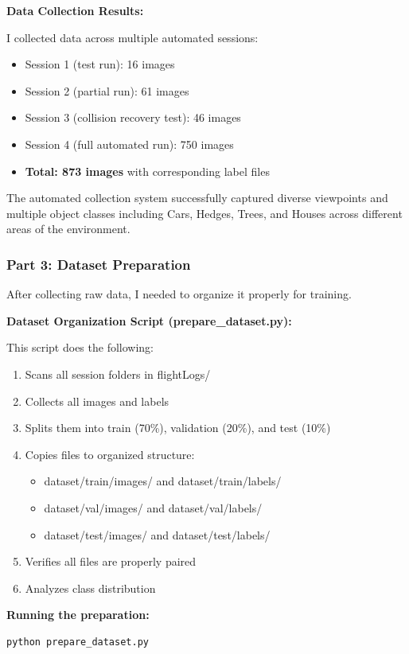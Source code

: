 \textbf{Data Collection Results:}

I collected data across multiple automated sessions:
\begin{itemize}
	\item Session 1 (test run): 16 images
	\item Session 2 (partial run): 61 images
	\item Session 3 (collision recovery test): 46 images
	\item Session 4 (full automated run): 750 images
	\item \textbf{Total: 873 images} with corresponding label files
\end{itemize}

The automated collection system successfully captured diverse viewpoints and multiple object classes including Cars, Hedges, Trees, and Houses across different areas of the environment.

\clearpage

\subsubsection{Part 3: Dataset Preparation}

After collecting raw data, I needed to organize it properly for training.

\textbf{Dataset Organization Script (prepare\_dataset.py):}

This script does the following:
\begin{enumerate}
	\item Scans all session folders in flightLogs/
	\item Collects all images and labels
	\item Splits them into train (70\%), validation (20\%), and test (10\%)
	\item Copies files to organized structure:
	\begin{itemize}
		\item dataset/train/images/ and dataset/train/labels/
		\item dataset/val/images/ and dataset/val/labels/
		\item dataset/test/images/ and dataset/test/labels/
	\end{itemize}
	\item Verifies all files are properly paired
	\item Analyzes class distribution
\end{enumerate}

\textbf{Running the preparation:}
\begin{verbatim}
python prepare_dataset.py
\end{verbatim}

